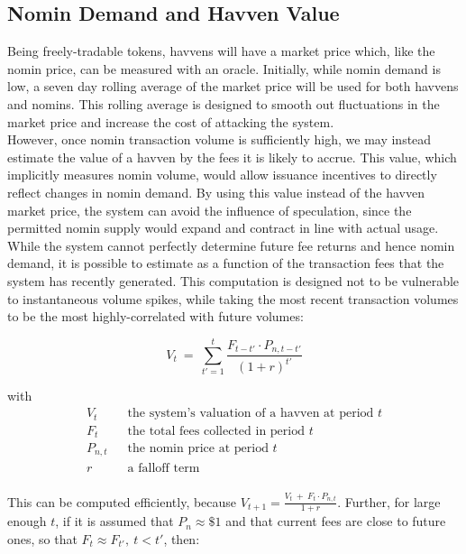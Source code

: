 \subsection{Nomin Demand and Havven Value}

\noindent Being freely-tradable tokens, havvens will have a market
price which, like the nomin price, can be measured with an oracle. Initially,
while nomin demand is low, a seven day rolling average of the market price
will be used for both havvens and nomins. This rolling average is designed to
smooth out fluctuations in the market price and increase the cost of
attacking the system.\\

\noindent However, once nomin transaction volume is sufficiently high, we may
instead estimate the value of a havven by the fees it is likely to accrue.
This value, which implicitly measures nomin volume, would allow issuance
incentives to directly reflect changes in nomin demand. By using this
value instead of the havven market price, the system can avoid the
influence of speculation, since the permitted nomin supply would expand
and contract in line with actual usage. \\

\noindent While the system cannot perfectly determine future fee returns and
hence nomin demand, it is possible to estimate as a function of the
transaction fees that the system has recently generated. This computation is
designed not to be vulnerable to instantaneous volume spikes, while taking
the most recent transaction volumes to be the most highly-correlated with
future volumes:
\vspace{3mm}

\begin{equation}
    V_{t} \ = \ \sum_{t'=1}^{t} \frac{F_{t - t'} \cdot P_{n,t - t'}}{{(1 + r)}^{t'}} \label{eq:price}
\end{equation}

with
\begin{align*} 
V_{t} \ \ & \text{ the system's valuation of a havven at period } t  \\
F_t \ \ & \text{ the total fees collected in period } t\\
P_{n,t} \ \ & \text{ the nomin price at period } t\\
r \ \ & \text{ a falloff term}  \\
\end{align*}

\noindent This can be computed efficiently, because \(V_{t+1} = \frac{V_t \ + \ F_t \cdot P_{n,t}}{1 + r}\). 
Further, for large enough \(t\), if it is assumed that \(P_n \approx \$1\) and that current fees are close to
future ones, so that \(F_t \approx F_{t'}, \ t < t'\), then:

